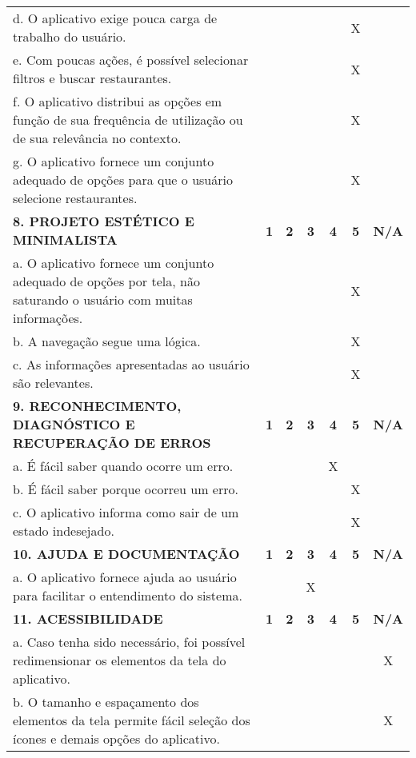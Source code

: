 \documentclass[portuguese,oneside]{tcc}
\begin{document}
\begin{center}
\begin{longtabu}{|L{25em}|c|c|c|c|c|c|}
							d. O aplicativo exige pouca carga de trabalho do usuário. & & & & & X & \\ 
							e. Com poucas ações, é possível selecionar filtros e buscar restaurantes. & & & & & X & \\ 
							f. O aplicativo distribui as opções em função de sua frequência de utilização ou de sua relevância no contexto.	& & & & & X & \\ 
							g. O aplicativo fornece um conjunto adequado de opções para que o usuário selecione restaurantes. & & & & & X & \\ 
							\textbf{8. PROJETO ESTÉTICO E MINIMALISTA} & \textbf{1} & \textbf{2} & \textbf{3} & \textbf{4} & \textbf{5} & \textbf{N/A} \\ 
							a. O aplicativo fornece um conjunto adequado de opções por tela, não saturando o usuário com muitas informações. & & & & & X & \\ 
							b. A navegação segue uma lógica. & & & & & X & \\ 
							c. As informações apresentadas ao usuário são relevantes. & & & & & X & \\ 
							\textbf{9. RECONHECIMENTO, DIAGNÓSTICO E RECUPERAÇÃO DE ERROS} & \textbf{1} & \textbf{2} & \textbf{3} & \textbf{4} & \textbf{5} & \textbf{N/A} \\ 
							a. É fácil saber quando ocorre um erro.	& & & & X & & \\ 
							b. É fácil saber porque ocorreu um erro. & & & & & X & \\ 
							c. O aplicativo informa como sair de um estado indesejado. & & & & & X & \\ 
							\textbf{10. AJUDA E DOCUMENTAÇÃO} & \textbf{1} & \textbf{2} & \textbf{3} & \textbf{4} & \textbf{5} & \textbf{N/A} \\ 
							a. O aplicativo fornece ajuda ao usuário para facilitar o entendimento do sistema. & & & X & & & \\ 
							\textbf{11. ACESSIBILIDADE} & \textbf{1} & \textbf{2} & \textbf{3} & \textbf{4} & \textbf{5} & \textbf{N/A} \\ 
							a. Caso tenha sido necessário, foi possível redimensionar os elementos da tela do aplicativo. & & & & & & X \\ 
							b. O tamanho e espaçamento dos elementos da tela permite fácil seleção dos ícones e demais opções do aplicativo. & & & & & & X \\ 

\end{longtabu}
\end{center}
\end{document}
